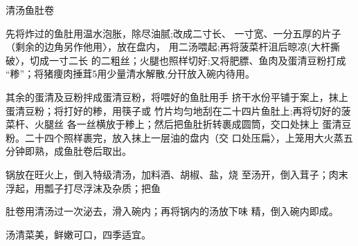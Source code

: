 \begin{recipe}{清汤鱼肚卷}

\ingredients



\cooking

\step 	先将炸过的鱼肚用温水泡胀，除尽油腻;改成二寸长、 一寸宽、一分五厚的片子（剩余的边角另作他用〉，放在盘内， 用二汤喂起;再将菠菜杆沮后晾凉(大杆撕破〉，切成一寸二长 的二粗丝；火腿也照样切好;又将肥膘、鱼肉及蛋清豆粉打成 “糁”；将猪痩肉捶茸5用少量清水解散,分幵放入碗内待用。

\step 	其余的蛋清及豆粉拌成蛋清豆粉，将喂好的鱼肚用手 挤干水份平铺于案上，抹上蛋清豆粉；将打好的糁，用筷子或 竹片均匀地刮在二十四片鱼肚上;再将切好的菠菜杆、火腿丝 各一丝横放于糁上；然后把鱼肚折转裹成圆筒，交口处抹上 蛋清豆粉。二十四个照样裹完，放入抹上一层油的盘内（交 口处压扁〉，上笼用大火蒸五分钟即熟，成鱼肚卷后取出。

\step 	锅放在旺火上，倒入特级清汤，加料酒、胡椒、盐，烧 至汤开，倒入茸子；肉末浮起，用瓢子打尽浮沫及杂质；把鱼

肚卷用清汤过一次泌去，滑入碗内；再将锅内的汤放下味 精，倒入碗内即成。

\notes

汤清菜美，鲜嫩可口，四季适宜。

\end{recipe}

